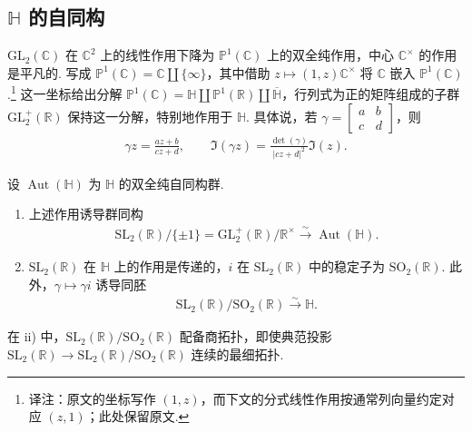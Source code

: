 \subsection{$\mathbb H$ 的自同构}\label{sec:modular-1-1-1}
$\mathrm{GL}_2(\mathbb C)$ 在 $\mathbb C^2$ 上的线性作用下降为 $\mathbb P^1(\mathbb C)$ 上的双全纯作用，中心 $\mathbb C^\times$ 的作用是平凡的. 写成 $\mathbb P^1(\mathbb C)=\mathbb C\coprod\{\infty\}$，其中借助 $z\mapsto(1,z)\mathbb C^\times$ 将 $\mathbb C$ 嵌入 $\mathbb P^1(\mathbb C)$.\footnote{译注：原文的坐标写作 $(1,z)$，而下文的分式线性作用按通常列向量约定对应 $(z,1)$；此处保留原文.}
这一坐标给出分解 $\mathbb P^1(\mathbb C)=\mathbb H\coprod\mathbb P^1(\mathbb R)\coprod\overline{\mathbb H}$，行列式为正的矩阵组成的子群 $\mathrm{GL}_2^+(\mathbb R)$ 保持这一分解，特别地作用于 $\mathbb H$. 具体说，若 $\gamma=\begin{bmatrix}a&b\\c&d\end{bmatrix}$，则
\begin{align*}
\gamma z=\frac{az+b}{cz+d},\qquad \Im(\gamma z)=\frac{\det(\gamma)}{|cz+d|^2}\Im(z).
\end{align*}
\begin{theorem*}
设 $\operatorname{Aut}(\mathbb H)$ 为 $\mathbb H$ 的双全纯自同构群.
\begin{enumerate}[label=\roman*)]
\item 上述作用诱导群同构
\begin{align*}
\mathrm{SL}_2(\mathbb R)/\{\pm1\}=\mathrm{GL}_2^+(\mathbb R)/\mathbb R^\times\xrightarrow{\sim}\operatorname{Aut}(\mathbb H).
\end{align*}
\item $\mathrm{SL}_2(\mathbb R)$ 在 $\mathbb H$ 上的作用是传递的，$i$ 在 $\mathrm{SL}_2(\mathbb R)$ 中的稳定子为 $\mathrm{SO}_2(\mathbb R)$. 此外，$\gamma\mapsto\gamma i$ 诱导同胚
\begin{align*}
\mathrm{SL}_2(\mathbb R)/\mathrm{SO}_2(\mathbb R)\xrightarrow{\sim}\mathbb H.
\end{align*}
\end{enumerate}
\end{theorem*}
在 ii) 中，$\mathrm{SL}_2(\mathbb R)/\mathrm{SO}_2(\mathbb R)$ 配备商拓扑，即使典范投影 $\mathrm{SL}_2(\mathbb R)\to\mathrm{SL}_2(\mathbb R)/\mathrm{SO}_2(\mathbb R)$ 连续的最细拓扑.
